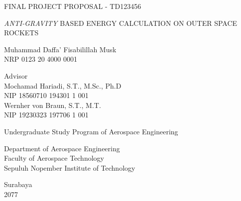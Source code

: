 \begin{large}
  FINAL PROJECT PROPOSAL - TD123456
\end{large}

\vspace{\fill}

\begin{spacing}{1.5}
  \begin{Large}
    \emph{ANTI-GRAVITY} BASED ENERGY CALCULATION ON OUTER SPACE ROCKETS
  \end{Large}
\end{spacing}

\vspace{\fill}

\begin{large}
  Muhammad Daffa' Fisabilillah Musk \\
  \textmd{NRP 0123 20 4000 0001}
\end{large}

\vspace{\fill}

\begin{large}
  \textmd{Advisor} \\
  Mochamad Hariadi, S.T., M.Sc., Ph.D \\
  \textmd{NIP 18560710 194301 1 001} \\
  Wernher von Braun, S.T., M.T. \\
  \textmd{NIP 19230323 197706 1 001}
\end{large}

\vspace{\fill}

Undergraduate Study Program of Aerospace Engineering \\

\mdseries

Department of Aerospace Engineering \\
Faculty of Aerospace Technology \\
Sepuluh Nopember Institute of Technology

Surabaya \\
2077

